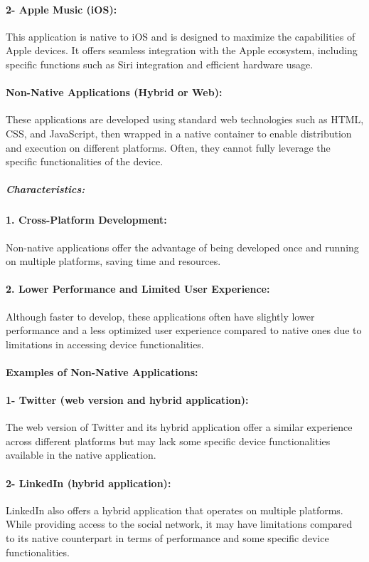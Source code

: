 \documentclass{article}
\begin{document}
\paragraph{2- Apple Music (iOS):}
This application is native to iOS and is designed to maximize the capabilities of Apple devices. It offers seamless integration with the Apple ecosystem, including specific functions such as Siri integration and efficient hardware usage.

\paragraph{Non-Native Applications (Hybrid or Web):}
These applications are developed using standard web technologies such as HTML, CSS, and JavaScript, then wrapped in a native container to enable distribution and execution on different platforms. Often, they cannot fully leverage the specific functionalities of the device.

\subparagraph{Characteristics:}
\paragraph{1. Cross-Platform Development:}
Non-native applications offer the advantage of being developed once and running on multiple platforms, saving time and resources.

\paragraph{2. Lower Performance and Limited User Experience:}
Although faster to develop, these applications often have slightly lower performance and a less optimized user experience compared to native ones due to limitations in accessing device functionalities.

\paragraph{Examples of Non-Native Applications:}
\paragraph{1- Twitter (web version and hybrid application):}
The web version of Twitter and its hybrid application offer a similar experience across different platforms but may lack some specific device functionalities available in the native application.

\paragraph{2- LinkedIn (hybrid application):}
LinkedIn also offers a hybrid application that operates on multiple platforms. While providing access to the social network, it may have limitations compared to its native counterpart in terms of performance and some specific device functionalities.
\end{document}
